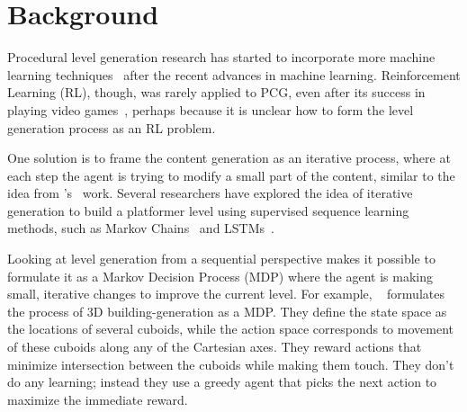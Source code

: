 \documentclass[letterpaper]{article} %
\begin{document}
\section{Background}

Procedural level generation research has started to incorporate more machine learning techniques~\cite{jain2016autoencoders,volz2018evolving} after the recent advances in machine learning. Reinforcement Learning (RL), though, was rarely applied to PCG, even after its success in playing video games~\cite{mnih2015human},
perhaps because it is unclear how to form the level generation process as an RL problem.


One solution is to frame the content generation as an iterative process, where at each step the agent is trying to modify a small part of the content, similar to the idea from \citeauthor{guzdial2018co}'s~ work. Several researchers have explored the idea of iterative generation to build a platformer level using supervised sequence learning methods, such as Markov Chains~\cite{snodgrass2014experiments} and 
LSTMs~\cite{summerville2016super}. 

Looking at level generation from a sequential perspective makes it possible to formulate it as a Markov Decision Process (MDP) where the agent is making small, iterative changes to improve the current level. For example, \citeauthor{mcdonald2019markov}~ formulates the process of 3D building-generation as a MDP. They define the state space as the locations of several cuboids, while the action space corresponds to movement of these cuboids along any of the Cartesian axes. They reward actions that minimize intersection between the cuboids while making them touch. They don't do any learning; instead they use a greedy agent that picks the next action to maximize the immediate reward.
\end{document}
